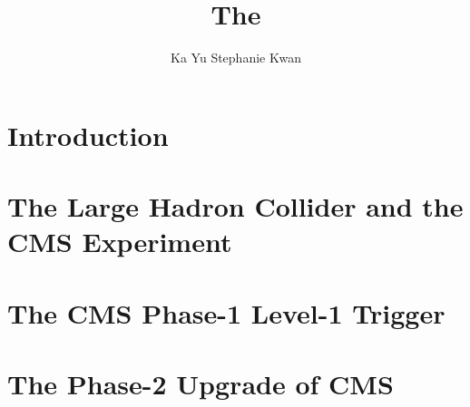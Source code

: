\documentclass[12pt,lot,lof]{puthesis}
\title{The}
\author{Ka Yu Stephanie Kwan}
\begin{document}
\chapter{Introduction}


\chapter{The Large Hadron Collider and the CMS Experiment}


\chapter{The CMS Phase-1 Level-1 Trigger}


\chapter{The Phase-2 Upgrade of CMS}

%

% 



 \label{bib}
\end{document}
